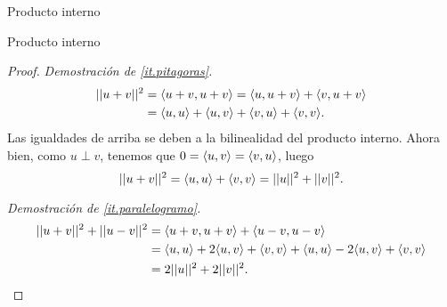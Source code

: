 \begin{chapter}{Producto interno}
\begin{section}{Producto interno}
\begin{proof}
            \textit{Demostración de \ref{it.pitagoras}.}
            \begin{align*}
            ||u+v||^2 &= \langle u+v, u+v\rangle = \langle u, u+v\rangle+\langle v, u+v\rangle \\
            &= \langle u, u\rangle+\langle u, v\rangle+\langle v, u\rangle+\langle v, v\rangle.
            \end{align*} 
            Las igualdades de arriba se deben a la bilinealidad del producto interno. 
            Ahora bien,  como $u\perp v$,  tenemos que $0 = \langle u, v\rangle=\langle v, u\rangle$, luego
            \begin{equation*}
            ||u+v||^2 = \langle u, u\rangle+ \langle v, v\rangle =  ||u||^2 + ||v||^2.
            \end{equation*} 
            
            \textit{Demostración de \ref{it.paralelogramo}.}
            \begin{align*}
            ||u+v||^2+ ||u-v||^2 &= \langle u+v, u+v\rangle + \langle u-v, u-v\rangle \\
            &= \langle u, u\rangle+2\langle u, v\rangle+\langle v, v\rangle + \langle u, u\rangle-2\langle u, v\rangle+\langle v, v\rangle \\
            &=  2||u||^2 + 2||v||^2.
            \end{align*}
        \end{proof}


\end{section}
\end{chapter}
